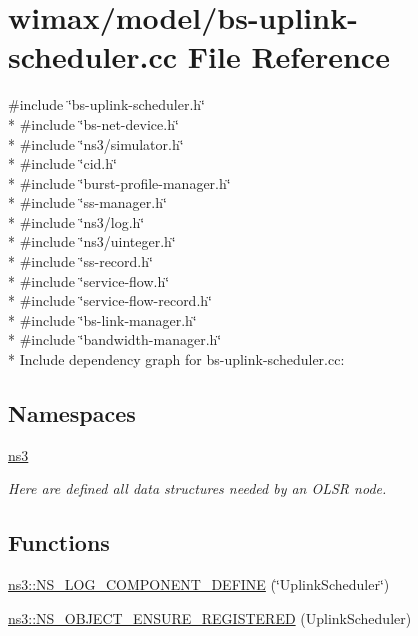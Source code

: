 \hypertarget{bs-uplink-scheduler_8cc}{}\section{wimax/model/bs-\/uplink-\/scheduler.cc File Reference}
\label{bs-uplink-scheduler_8cc}
{\ttfamily \#include \char`\"{}bs-\/uplink-\/scheduler.\+h\char`\"{}}\\*
{\ttfamily \#include \char`\"{}bs-\/net-\/device.\+h\char`\"{}}\\*
{\ttfamily \#include \char`\"{}ns3/simulator.\+h\char`\"{}}\\*
{\ttfamily \#include \char`\"{}cid.\+h\char`\"{}}\\*
{\ttfamily \#include \char`\"{}burst-\/profile-\/manager.\+h\char`\"{}}\\*
{\ttfamily \#include \char`\"{}ss-\/manager.\+h\char`\"{}}\\*
{\ttfamily \#include \char`\"{}ns3/log.\+h\char`\"{}}\\*
{\ttfamily \#include \char`\"{}ns3/uinteger.\+h\char`\"{}}\\*
{\ttfamily \#include \char`\"{}ss-\/record.\+h\char`\"{}}\\*
{\ttfamily \#include \char`\"{}service-\/flow.\+h\char`\"{}}\\*
{\ttfamily \#include \char`\"{}service-\/flow-\/record.\+h\char`\"{}}\\*
{\ttfamily \#include \char`\"{}bs-\/link-\/manager.\+h\char`\"{}}\\*
{\ttfamily \#include \char`\"{}bandwidth-\/manager.\+h\char`\"{}}\\*
Include dependency graph for bs-\/uplink-\/scheduler.cc\+:
\subsection*{Namespaces}
\begin{DoxyCompactItemize}
\item 
 \hyperlink{namespacens3}{ns3}
\begin{DoxyCompactList}\small\item\em Here are defined all data structures needed by an O\+L\+SR node. \end{DoxyCompactList}\end{DoxyCompactItemize}
\subsection*{Functions}
\begin{DoxyCompactItemize}
\item 
\hyperlink{namespacens3_aac70d22352fe804c3915b09588e41b8c}{ns3\+::\+N\+S\+\_\+\+L\+O\+G\+\_\+\+C\+O\+M\+P\+O\+N\+E\+N\+T\+\_\+\+D\+E\+F\+I\+NE} (\char`\"{}Uplink\+Scheduler\char`\"{})
\item 
\hyperlink{namespacens3_aabf0016090b108334199d8a94e7095cd}{ns3\+::\+N\+S\+\_\+\+O\+B\+J\+E\+C\+T\+\_\+\+E\+N\+S\+U\+R\+E\+\_\+\+R\+E\+G\+I\+S\+T\+E\+R\+ED} (Uplink\+Scheduler)
\end{DoxyCompactItemize}
